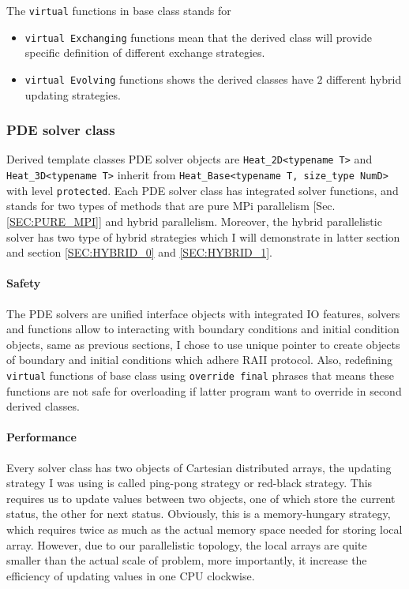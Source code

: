 The \texttt{virtual} functions in base class stands for
\begin{itemize}
  \item \texttt{virtual Exchanging} functions mean that the derived class will provide specific definition of different exchange strategies.
  \item \texttt{virtual Evolving} functions shows the derived classes have $2$ different hybrid updating strategies.
\end{itemize}

\subsubsection{PDE solver class}
Derived template classes PDE solver objects are 
\texttt{Heat\_2D<typename T>} and 
\texttt{Heat\_3D<typename T>} inherit from 
\texttt{Heat\_Base<typename T, size\_type NumD>} 
with level 
\texttt{protected}. 
Each PDE solver class has integrated solver functions, and stands for two types of methods that are pure MPi parallelism 
                                      [Sec. \ref{SEC:PURE_MPI}] and hybrid parallelism.
Moreover, the hybrid parallelistic solver has two type of hybrid strategies which I will demonstrate in latter section and section
                                       \ref{SEC:HYBRID_0} and \ref{SEC:HYBRID_1}.

\paragraph{Safety}
The PDE solvers are unified interface objects with integrated IO features, solvers and functions allow to interacting with boundary conditions and initial condition objects,
same as previous sections, I chose to use unique pointer to create objects of boundary and initial conditions which adhere RAII protocol.
Also, redefining \texttt{virtual} functions of base class using \texttt{override final} phrases that means these functions are not safe for overloading if latter program want to 
override in second derived classes. 

\paragraph{Performance}
Every solver class has two objects of Cartesian distributed arrays, the updating strategy I was using is called ping-pong strategy or red-black strategy.
This requires us to update values between two objects, one of which store the current status, the other for next status.
Obviously, this is a memory-hungary strategy, which requires twice as much as the actual memory space needed for storing local array.
However, due to our parallelistic topology, the local arrays are quite smaller than the actual scale of problem, more importantly, 
it increase the efficiency of updating values in one CPU clockwise.



